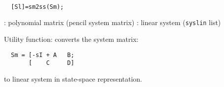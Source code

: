 \begin{mandesc}
   \\ %
\end{mandesc}
\begin{calling_sequence}
\begin{verbatim}
  [Sl]=sm2ss(Sm);  
\end{verbatim}
\end{calling_sequence}
\begin{parameters}
  \begin{varlist}
    : polynomial matrix (pencil system matrix)
    : linear system (\verb!syslin! list)
  \end{varlist}
\end{parameters}
\begin{mandescription}
  Utility function: converts the system matrix:
\begin{verbatim}
  Sm = [-sI + A   B;
       [    C     D]
\end{verbatim}
  to linear system in state-space representation.
\end{mandescription}
\begin{manseealso}
\end{manseealso}

